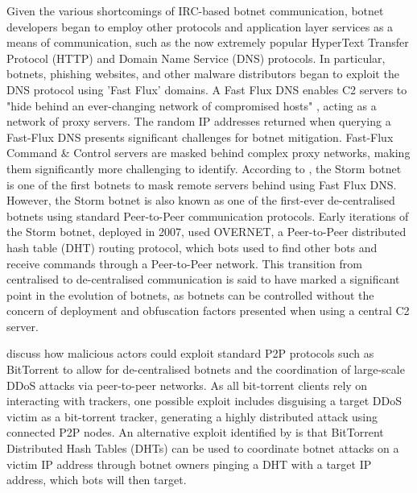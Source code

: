 Given the various shortcomings of IRC-based botnet communication, botnet developers began to employ other protocols and application layer services as a means of communication, such as the now extremely popular HyperText Transfer Protocol (HTTP) and Domain Name Service (DNS) protocols. In particular, botnets, phishing websites, and other malware distributors began to exploit the DNS protocol using 'Fast Flux' domains. A Fast Flux DNS enables C2 servers to "hide behind an ever-changing network of compromised hosts" \citep{Morton2017}, acting as a network of proxy servers. The random IP addresses returned when querying a Fast-Flux DNS presents significant challenges for botnet mitigation. Fast-Flux Command \& Control servers are masked behind complex proxy networks, making them significantly more challenging to identify. According to \citet{Morton2017}, the Storm botnet is one of the first botnets to mask remote servers behind using Fast Flux DNS. However, the Storm botnet is also known as one of the first-ever de-centralised botnets using standard Peer-to-Peer communication protocols. Early iterations of the Storm botnet, deployed in 2007, used OVERNET, a Peer-to-Peer distributed hash table (DHT) routing protocol, which bots used to find other bots and receive commands through a Peer-to-Peer network. \citep{Holz2008} This transition from centralised to de-centralised communication is said to have marked a significant point in the evolution of botnets, as botnets can be controlled without the concern of deployment and obfuscation factors presented when using a central C2 server.

\citet{ElDefrawy2007} discuss how malicious actors could exploit standard P2P protocols such as BitTorrent to allow for de-centralised botnets and the coordination of large-scale DDoS attacks via peer-to-peer networks. As all bit-torrent clients rely on interacting with trackers, one possible exploit includes disguising a target DDoS victim as a bit-torrent tracker, generating a highly distributed attack using connected P2P nodes. An alternative exploit identified by \citet{ElDefrawy2007} is that BitTorrent Distributed Hash Tables (DHTs) can be used to coordinate botnet attacks on a victim IP address through botnet owners pinging a DHT with a target IP address, which bots will then target. 


